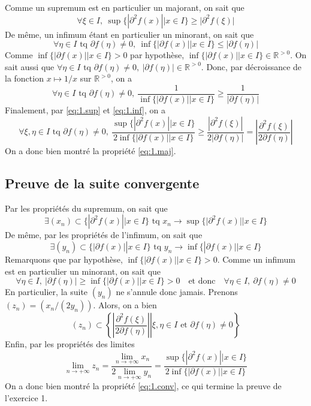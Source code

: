 \documentclass[a4paper, 12pt]{article}
\begin{document}
Comme un supremum est en particulier un majorant, on sait que
\begin{equation}
    \label{eq:1.sup}
    \forall \xi \in I,~ \sup \{ | \partial^2 f(x) || x \in I \} \geq |\partial^2 f(\xi)|
\end{equation}
De même, un infimum étant en particulier un minorant, on sait que
$$
\forall \eta \in I \text{ tq } \partial f(\eta) \neq 0,~ \inf \{ |\partial f(x)|| x \in I \} \leq |\partial f(\eta)|
$$
Comme \( \inf \{ |\partial f(x)|| x \in I \} > 0 \) par hypothèse, \( \inf \{ |\partial f(x)|| x \in I \} \in \mathbb{R}^{>0} \). On sait aussi que 
\(\forall \eta \in I \text{ tq } \partial f(\eta) \neq 0,~ |\partial f(\eta)| \in \mathbb{R}^{>0} \).
Donc, par décroissance de la fonction \( x \mapsto 1/x \) sur \( \mathbb{R}^{>0} \), on a
\begin{equation}
    \label{eq:1.inf}
    \forall \eta \in I \text{ tq } \partial f(\eta) \neq 0,~ \frac{1}{\inf \{ |\partial f(x)|| x \in I \}} \geq \frac{1}{|\partial f(\eta)|}
\end{equation}
Finalement, par \eqref{eq:1.sup} et \eqref{eq:1.inf}, on a
$$
\forall \xi, \eta \in I \text{ tq } \partial f(\eta) \neq 0,~ \frac{\sup \{ | \partial^2 f(x) || x \in I \}}{2 \inf \{ |\partial f(x)|| x \in I \}}
\geq \frac{| \partial^2f(\xi)|}{2|\partial f(\eta)|}
= \left| \frac{\partial^2f(\xi)}{2\partial f(\eta)} \right|
$$
On a donc bien montré la propriété \eqref{eq:1.maj}.

\newpage

\subsection{Preuve de la suite convergente}

Par les propriétés du supremum, on sait que
$$
\exists (x_n) \subset \{ | \partial^2 f(x) || x \in I \} \text{ tq } x_n \to \sup \{ | \partial^2 f(x) || x \in I \}
$$
De même, par les propriétés de l'infimum, on sait que
$$
\exists (y_n) \subset \{ |\partial f(x)|| x \in I \} \text { tq } y_n \to \inf \{ |\partial f(x)|| x \in I \}
$$
Remarquons que par hypothèse, \( \inf\{|\partial f(x)| | x \in I\} > 0 \). Comme un infimum est en particulier un minorant, on sait que
$$
\forall \eta \in I,~ |\partial f(\eta)| \geq \inf\{|\partial f(x)| | x \in I\} > 0 \quad \text{et donc} \quad \forall \eta \in I,~ \partial f(\eta) \neq 0
$$
En particulier, la suite \( (y_n) \) ne s'annule donc jamais. Prenons \( (z_n) = (x_n/(2y_n)) \). Alors, on a bien
$$
(z_n) \subset
\left\{ \left. \left| \frac{\partial^2f(\xi)}{2\partial f(\eta)} \right| \right| \xi, \eta \in I \text{ et } \partial f(\eta) \neq 0 \right\}
$$
Enfin, par les propriétés des limites
$$
\lim_{n \to +\infty} z_n
= \frac{\lim_{n \to +\infty} x_n}{2 \lim_{n \to +\infty} y_n}
= \frac{\sup \{ | \partial^2 f(x) || x \in I \}}{2 \inf \{ |\partial f(x)|| x \in I \}}
$$
On a donc bien montré la propriété \eqref{eq:1.conv}, ce qui termine la preuve de l'exercice 1.
\end{document}
